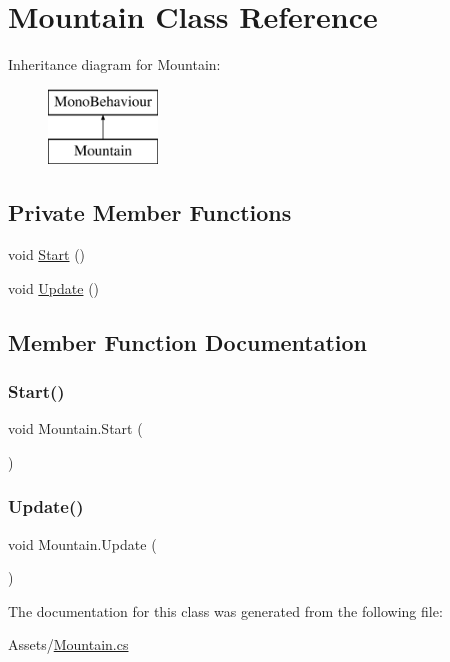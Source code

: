\hypertarget{class_mountain}{}\section{Mountain Class Reference}
\label{class_mountain}
Inheritance diagram for Mountain\+:\begin{figure}[H]
\begin{center}
\leavevmode
\includegraphics[height=2.000000cm]{class_mountain}
\end{center}
\end{figure}
\subsection*{Private Member Functions}
\begin{DoxyCompactItemize}
\item 
void \hyperlink{class_mountain_ad820629d33b788dc3a95dc92330ded8c}{Start} ()
\item 
void \hyperlink{class_mountain_a5083994b8a81bb115256ede2566fa8e9}{Update} ()
\end{DoxyCompactItemize}


\subsection{Member Function Documentation}
\mbox{\label{class_mountain_ad820629d33b788dc3a95dc92330ded8c}} 
\subsubsection{\texorpdfstring{Start()}{Start()}}
{\footnotesize\ttfamily void Mountain.\+Start (\begin{DoxyParamCaption}{ }\end{DoxyParamCaption})\hspace{0.3cm}{\ttfamily [private]}}

\mbox{\label{class_mountain_a5083994b8a81bb115256ede2566fa8e9}} 
\subsubsection{\texorpdfstring{Update()}{Update()}}
{\footnotesize\ttfamily void Mountain.\+Update (\begin{DoxyParamCaption}{ }\end{DoxyParamCaption})\hspace{0.3cm}{\ttfamily [private]}}



The documentation for this class was generated from the following file\+:\begin{DoxyCompactItemize}
\item 
Assets/\hyperlink{_mountain_8cs}{Mountain.\+cs}\end{DoxyCompactItemize}
